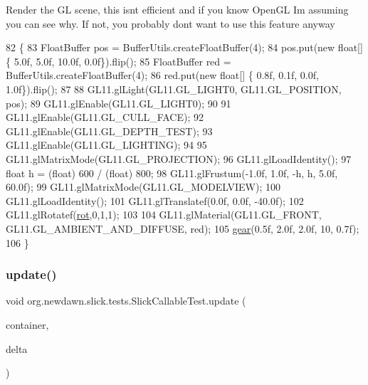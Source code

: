 Render the GL scene, this isn\textquotesingle{}t efficient and if you know Open\+GL I\textquotesingle{}m assuming you can see why. If not, you probably don\textquotesingle{}t want to use this feature anyway 
\begin{DoxyCode}
82                            \{        
83         FloatBuffer pos = BufferUtils.createFloatBuffer(4);
84         pos.put(\textcolor{keyword}{new} \textcolor{keywordtype}{float}[] \{ 5.0f, 5.0f, 10.0f, 0.0f\}).flip();
85         FloatBuffer red = BufferUtils.createFloatBuffer(4);
86         red.put(\textcolor{keyword}{new} \textcolor{keywordtype}{float}[] \{ 0.8f, 0.1f, 0.0f, 1.0f\}).flip();
87     
88         GL11.glLight(GL11.GL\_LIGHT0, GL11.GL\_POSITION, pos);
89         GL11.glEnable(GL11.GL\_LIGHT0);
90 
91         GL11.glEnable(GL11.GL\_CULL\_FACE);
92         GL11.glEnable(GL11.GL\_DEPTH\_TEST);
93         GL11.glEnable(GL11.GL\_LIGHTING);
94         
95         GL11.glMatrixMode(GL11.GL\_PROJECTION);
96         GL11.glLoadIdentity();
97         \textcolor{keywordtype}{float} h = (float) 600 / (\textcolor{keywordtype}{float}) 800;
98         GL11.glFrustum(-1.0f, 1.0f, -h, h, 5.0f, 60.0f);
99         GL11.glMatrixMode(GL11.GL\_MODELVIEW);
100         GL11.glLoadIdentity();  
101         GL11.glTranslatef(0.0f, 0.0f, -40.0f);  
102         GL11.glRotatef(\mbox{\hyperlink{classorg_1_1newdawn_1_1slick_1_1tests_1_1_slick_callable_test_a5a8dc15fc39af58f212dd3f482f7a57f}{rot}},0,1,1);       
103         
104         GL11.glMaterial(GL11.GL\_FRONT, GL11.GL\_AMBIENT\_AND\_DIFFUSE, red);
105         \mbox{\hyperlink{classorg_1_1newdawn_1_1slick_1_1tests_1_1_slick_callable_test_a638b94eb5a18d4f59659783ab98db264}{gear}}(0.5f, 2.0f, 2.0f, 10, 0.7f);
106     \}
\end{DoxyCode}
\mbox{\label{classorg_1_1newdawn_1_1slick_1_1tests_1_1_slick_callable_test_a8ba69f4047784e9a9778f20b467729b8}} 
\subsubsection{\texorpdfstring{update()}{update()}}
{\footnotesize\ttfamily void org.\+newdawn.\+slick.\+tests.\+Slick\+Callable\+Test.\+update (\begin{DoxyParamCaption}\item[{\mbox{\hyperlink{classorg_1_1newdawn_1_1slick_1_1_game_container}{Game\+Container}}}]{container,  }\item[{int}]{delta }\end{DoxyParamCaption})\hspace{0.3cm}{\ttfamily [inline]}}


